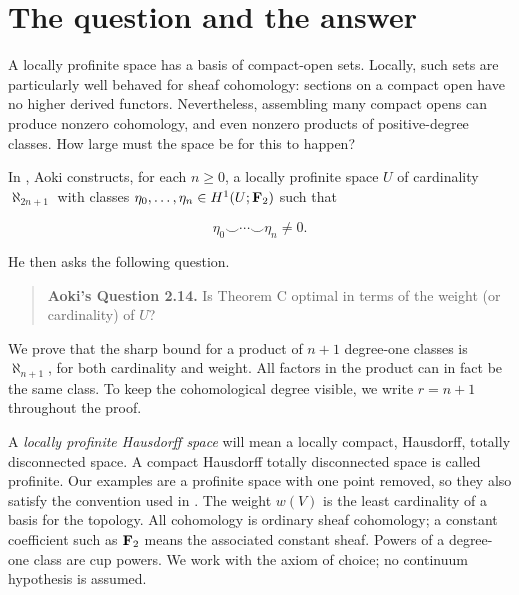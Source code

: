 \section{The question and the answer}
\label{sec:introduction}

A locally profinite space has a basis of compact-open sets. Locally, such
sets are particularly well behaved for sheaf cohomology: sections on a
compact open have no higher derived functors. Nevertheless, assembling
many compact opens can produce nonzero cohomology, and even nonzero
products of positive-degree classes. How large must the space be for
this to happen?

In \cite[Theorem C]{Aoki}, Aoki constructs, for each \(n\geq0\), a locally
profinite space \(U\) of cardinality \(\aleph_{2n+1}\) with classes
\(\eta_0,\ldots,\eta_n\in H^1(U;\mathbf F_2)\) such that

\[
\eta_0\smile\cdots\smile\eta_n\neq0.
\]

He then asks the following question.

\begin{quote}
\textbf{Aoki's Question 2.14.}
Is Theorem C optimal in terms of the weight (or cardinality) of \(U\)?
\end{quote}

We prove that the sharp bound for a product of \(n+1\) degree-one classes
is \(\aleph_{n+1}\), for both cardinality and weight. All factors in the
product can in fact be the same class. To keep the cohomological degree
visible, we write \(r=n+1\) throughout the proof.

A \emph{locally profinite Hausdorff space} will mean a locally compact,
Hausdorff, totally disconnected space. A compact Hausdorff totally
disconnected space is called profinite. Our examples are a profinite
space with one point removed, so they also satisfy the convention used
in \cite{Aoki}. The weight \(w(V)\) is the least cardinality of a basis for the topology.
All cohomology is ordinary sheaf cohomology; a constant
coefficient such as \(\mathbf F_2\) means the associated constant sheaf. Powers
of a degree-one class are cup powers. We work with the axiom of choice;
no continuum hypothesis is assumed.

